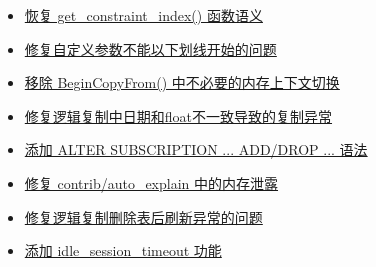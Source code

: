 \documentclass[10pt,a4paper]{xresume}
\begin{document}
\begin{minipage}[t]{0.66\textwidth}
  \begin{itemize}
  \item \href{https://git.postgresql.org/gitweb/?p=postgresql.git;a=commit;h=641f3dffcdf1c7378cfb94c98b6642793181d6db}{恢复 get\_constraint\_index() 函数语义}
  \item \href{https://git.postgresql.org/gitweb/?p=postgresql.git;a=commit;h=bd74c4037c4ee268db46e983bcc0f1e0a9f7ab72}{修复自定义参数不能以下划线开始的问题}
  \item \href{https://git.postgresql.org/gitweb/?p=postgresql.git;a=commit;h=89f059bdf52cc9a86b890d42ceed92237123479e}{移除 BeginCopyFrom() 中不必要的内存上下文切换}
  \item \href{https://git.postgresql.org/gitweb/?p=postgresql.git;a=commit;h=f3d4019da5d026f2c3fe5bd258becf6fbb6b4673}{修复逻辑复制中日期和float不一致导致的复制异常}
  \item \href{https://git.postgresql.org/gitweb/?p=postgresql.git;a=commit;h=82ed7748b710e3ddce3f7ebc74af80fe4869492f}{添加 ALTER SUBSCRIPTION ... ADD/DROP ... 语法}
  \item \href{https://git.postgresql.org/gitweb/?p=postgresql.git;a=commit;h=5c0f7cc5442108e113d4fb88c952329b467e2c6a}{修复 contrib/auto\_explain 中的内存泄露}
  \item \href{https://git.postgresql.org/gitweb/?p=postgresql.git;a=commit;h=40ab64c1ec1cb9bd73695f519cf66ddbb97d8144}{修复逻辑复制删除表后刷新异常的问题}
  \item \href{https://git.postgresql.org/gitweb/?p=postgresql.git;a=commit;h=9877374bef76ef03923f6aa8b955f2dbcbe6c2c7}{添加 idle\_session\_timeout 功能}
  \end{itemize}

\end{minipage}

\newpage

\end{document}
